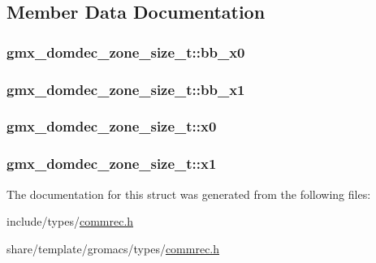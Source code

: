 \subsection{\-Member \-Data \-Documentation}
\hypertarget{structgmx__domdec__zone__size__t_aba0d4cf17c1c939e57568a406d9981b4}{
\subsubsection[{bb\-\_\-x0}]{ {\bf gmx\-\_\-domdec\-\_\-zone\-\_\-size\-\_\-t\-::bb\-\_\-x0}}}\label{structgmx__domdec__zone__size__t_aba0d4cf17c1c939e57568a406d9981b4}
\hypertarget{structgmx__domdec__zone__size__t_ab4e5c8c456aeddbe6ffbc63128c1c755}{
\subsubsection[{bb\-\_\-x1}]{ {\bf gmx\-\_\-domdec\-\_\-zone\-\_\-size\-\_\-t\-::bb\-\_\-x1}}}\label{structgmx__domdec__zone__size__t_ab4e5c8c456aeddbe6ffbc63128c1c755}
\hypertarget{structgmx__domdec__zone__size__t_abc6646c2c36ad6d612514346b892d31f}{
\subsubsection[{x0}]{ {\bf gmx\-\_\-domdec\-\_\-zone\-\_\-size\-\_\-t\-::x0}}}\label{structgmx__domdec__zone__size__t_abc6646c2c36ad6d612514346b892d31f}
\hypertarget{structgmx__domdec__zone__size__t_af0bee95d21f308741535223757192890}{
\subsubsection[{x1}]{ {\bf gmx\-\_\-domdec\-\_\-zone\-\_\-size\-\_\-t\-::x1}}}\label{structgmx__domdec__zone__size__t_af0bee95d21f308741535223757192890}


\-The documentation for this struct was generated from the following files\-:\begin{DoxyCompactItemize}
\item 
include/types/\hyperlink{include_2types_2commrec_8h}{commrec.\-h}\item 
share/template/gromacs/types/\hyperlink{share_2template_2gromacs_2types_2commrec_8h}{commrec.\-h}\end{DoxyCompactItemize}
